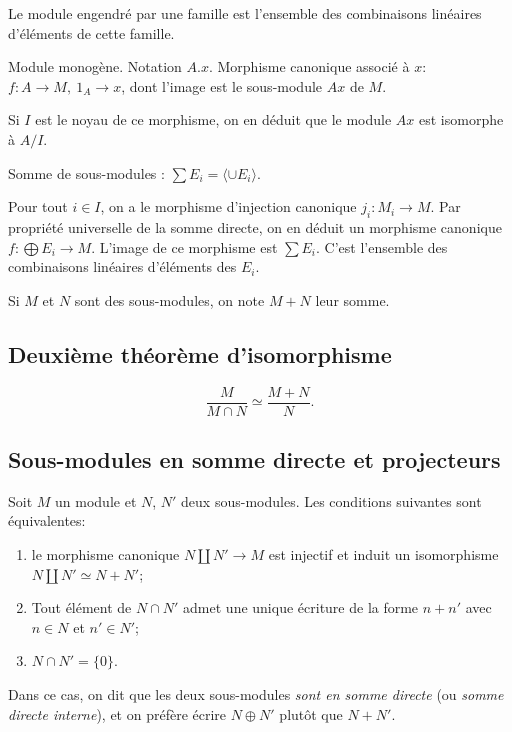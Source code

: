 \begin{theoreme} Le module engendré par une famille est l'ensemble des combinaisons linéaires d'éléments de cette famille.
\end{theoreme}

\begin{definition} Module monogène. Notation $A.x$. Morphisme canonique associé à $x$:  $f : A \to M, \: 1_A \to x$, dont l'image est le sous-module $Ax$ de $M$.
\end{definition}

Si $I$ est le noyau de ce morphisme, on en déduit que le module $Ax$ est isomorphe à $A/I$.


\begin{definition}
Somme de sous-modules : $\sum E_i = \langle \cup E_i \rangle$.
\end{definition}

Pour tout $i \in I$, on a le morphisme d'injection canonique $j_i : M_i \to M$. Par propriété universelle de la somme directe, on en déduit un morphisme canonique $f : \bigoplus E_i \to M$. L'image de ce morphisme est $\sum E_i$. C'est l'ensemble des combinaisons linéaires d'éléments des $E_i$.


\begin{notation} Si $M$ et $N$ sont des sous-modules, on note $M+N$ leur somme.\end{notation}

\subsection{Deuxième théorème d'isomorphisme}

\begin{theoreme}
\[
\frac{M}{M\cap N} \simeq \frac{M+N}{N}.
\]
\end{theoreme}

\subsection{Sous-modules en somme directe et projecteurs}

\begin{propdef} Soit $M$ un module et $N$, $N'$ deux sous-modules. Les conditions suivantes sont équivalentes:
\begin{enumerate}
\item le morphisme canonique $N \coprod N' \to M$ est injectif et induit un isomorphisme $N\coprod N' \simeq N+N'$;
\item Tout élément de $N\cap N'$ admet une unique écriture de la forme $n+n'$ avec $n\in N$ et $n'\in N'$;
\item $N\cap N' = \{0\}$.
\end{enumerate}
Dans ce cas, on dit que les deux sous-modules \emph{sont en somme directe} (ou \emph{somme directe interne}), et on préfère écrire $N\oplus N'$ plutôt que $N+N'$.
\end{propdef}

